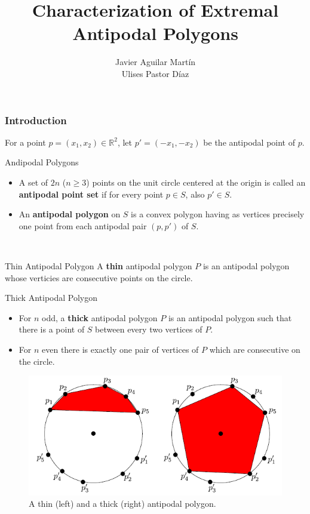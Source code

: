 \documentclass{beamer}
\title{Characterization of Extremal Antipodal Polygons}
\author{Javier Aguilar Martín\\ Ulises Pastor Díaz}
\institute{Universidad de Sevilla}
\newcommand{\R}{\mathbb{R}}
\begin{document}
\frame{\titlepage}

\begin{frame}
\frametitle{Introduction}

For a point $p=(x_1,x_2)\in\R^2$, let $p'=(-x_1,-x_2)$ be the antipodal point of $p$.\pause

\begin{block}{Andipodal Polygons}
\begin{itemize}
\item A set of $2n$ ($n\geq 3$) points on the unit circle centered at the origin is called an \textbf{antipodal point set} if for every point $p\in S$, also $p'\in S$.\pause

\item An \textbf{antipodal polygon} on $S$ is a convex polygon having as vertices
precisely one point from each antipodal pair $(p , p')$ of $S$.
\end{itemize}
\end{block}\

\end{frame}

\begin{frame}
\begin{block}{Thin Antipodal Polygon}
A \textbf{thin} antipodal polygon $P$ is an antipodal polygon whose verticies are consecutive points on the circle.
\end{block}\pause


\begin{block}{Thick Antipodal Polygon}
\begin{itemize}
\item<1-> For $n$ odd, a \textbf{thick} antipodal polygon $P$ is an antipodal polygon such that there is a point of $S$ between every two vertices of $P$. 
\item<2-> For $n$ even there is exactly one pair of vertices of $P$ which are consecutive on the circle. 
\end{itemize}
\end{block}
\end{frame}

\begin{frame}
\begin{figure}[h!]
\centering
\includegraphics[scale=0.7]{fig1}
\caption{A thin (left) and a thick (right) antipodal polygon.}
\end{figure}
\end{frame}
\end{document}
